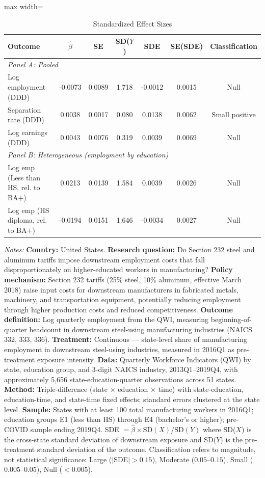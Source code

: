 \begin{table}[t]
\centering
\caption{Standardized Effect Sizes}
\label{tab:sde}
\begin{adjustbox}{max width=\textwidth}
\begin{tabular}{lcccccc}
\toprule
Outcome & $\hat{\beta}$ & SE & SD($Y$) & SDE & SE(SDE) & Classification \\
\midrule
\multicolumn{7}{l}{\textit{Panel A: Pooled}} \\
Log employment (DDD) & -0.0073 & 0.0089 & 1.718 & -0.0012 & 0.0015 & Null \\
Separation rate (DDD) & 0.0038 & 0.0017 & 0.080 & 0.0138 & 0.0062 & Small positive \\
Log earnings (DDD) & 0.0043 & 0.0076 & 0.319 & 0.0039 & 0.0069 & Null \\
\midrule
\multicolumn{7}{l}{\textit{Panel B: Heterogeneous (employment by education)}} \\
Log emp (Less than HS, rel. to BA+) & 0.0213 & 0.0139 & 1.584 & 0.0039 & 0.0026 & Null \\
Log emp (HS diploma, rel. to BA+) & -0.0194 & 0.0151 & 1.646 & -0.0034 & 0.0027 & Null \\
\bottomrule
\end{tabular}
\end{adjustbox}
\par\vspace{0.3em}
{\footnotesize \textit{Notes:} \textbf{Country:} United States. \textbf{Research question:} Do Section 232 steel and aluminum tariffs impose downstream employment costs that fall disproportionately on higher-educated workers in manufacturing? \textbf{Policy mechanism:} Section 232 tariffs (25\% steel, 10\% aluminum, effective March 2018) raise input costs for downstream manufacturers in fabricated metals, machinery, and transportation equipment, potentially reducing employment through higher production costs and reduced competitiveness. \textbf{Outcome definition:} Log quarterly employment from the QWI, measuring beginning-of-quarter headcount in downstream steel-using manufacturing industries (NAICS 332, 333, 336). \textbf{Treatment:} Continuous --- state-level share of manufacturing employment in downstream steel-using industries, measured in 2016Q1 as pre-treatment exposure intensity. \textbf{Data:} Quarterly Workforce Indicators (QWI) by state, education group, and 3-digit NAICS industry, 2013Q1--2019Q4, with approximately 5,656 state-education-quarter observations across 51 states. \textbf{Method:} Triple-difference (state $\times$ education $\times$ time) with state-education, education-time, and state-time fixed effects; standard errors clustered at the state level. \textbf{Sample:} States with at least 100 total manufacturing workers in 2016Q1; education groups E1 (less than HS) through E4 (bachelor's or higher); pre-COVID sample ending 2019Q4. SDE $= \hat{\beta} \times \text{SD}(X) / \text{SD}(Y)$ where SD($X$) is the cross-state standard deviation of downstream exposure and SD($Y$) is the pre-treatment standard deviation of the outcome. Classification refers to magnitude, not statistical significance: Large ($|$SDE$| > 0.15$), Moderate ($0.05$--$0.15$), Small ($0.005$--$0.05$), Null ($< 0.005$).}
\end{table}
